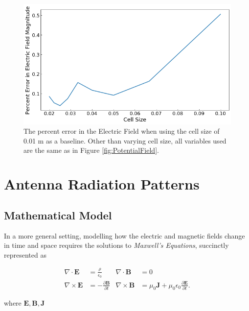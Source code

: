 \documentclass{report}
\begin{document}
            \begin{figure}[h]
                \centering
                \includegraphics[width=0.66\linewidth]{images/PercentErrorCell.png}
                \caption{The percent error in the Electric Field when using the cell size of 0.01 m as a baseline. Other than varying cell size, all variables used are the same as in Figure \ref{fig:PotentialField}.}
                \label{fig:cellsize}
            \end{figure}

\pagebreak

    \section{Antenna Radiation Patterns}

        \subsection{Mathematical Model}

            In a more general setting, modelling how the electric and magnetic fields change in time and space requires the solutions to \emph{Maxwell's Equations}\cite{griffiths2017introduction}, succinctly represented as

            \begin{equation}
            \begin{aligned}
                \nabla \cdot \mathbf{E}  &= \frac{\rho}{\epsilon_0}                 & \nabla \cdot \mathbf{B}  &= 0 \\
                \nabla \times \mathbf{E} &= -\frac{\partial \mathbf{B}}{\partial t} & \nabla \times \mathbf{B} &= \mu_0 \mathbf{J} + \mu_0 \epsilon_0 \frac{\partial \mathbf{E}}{\partial t}.
            \end{aligned}
            \end{equation}

            where $\mathbf{E}, \mathbf{B}, \mathbf{J}$
\end{document}
